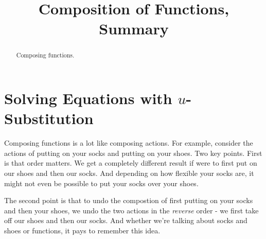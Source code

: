 \documentclass{ximera}
\title{Composition of Functions, Summary}
\begin{document}
\begin{abstract}
Composing functions.
\end{abstract}
\maketitle



\section{Solving Equations with $u$-Substitution}

Composing functions is a lot like composing actions. For example, consider the actions of putting on your socks and putting on your shoes. Two key points. First is that order matters. We get a completely different result if were to first put on our shoes and then our socks. And depending on how flexible your socks are, it might not even be possible to put your socks over your shoes.

The second point is that to undo the compostion of first putting on your socks and then your shoes, we undo the two actions in the \emph{reverse} order - we first take off our shoes and then our socks. And whether we're talking about socks and shoes or functions, it pays to remember this idea.
\end{document}
